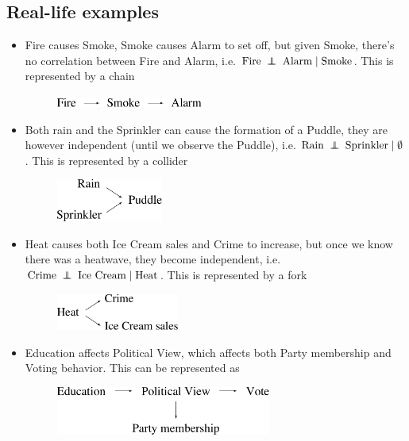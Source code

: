 \subsection{Real-life examples}
\begin{itemize}
	\item Fire causes Smoke, Smoke causes Alarm to set off, but given Smoke, there's no correlation between Fire and Alarm, i.e. $\text{Fire}\;\independent\;\text{Alarm}\;|\;\text{Smoke}$. This is represented by a chain
	\begin{figure}[h!]
	\centering
		\includegraphics[height=2.8mm]{./figs/04-fire-smoke-alarm.pdf} 
	\end{figure}

	\item Both rain and the Sprinkler can cause the formation of a Puddle, they are however independent (until we observe the Puddle), i.e. $\text{Rain}\;\independent\;\text{Sprinkler}\;|\;\emptyset$. This is represented by a collider
	\begin{figure}[h!]
	\centering
		\includegraphics[height=14mm]{./figs/04-rain-puddle-sprinkler.pdf} 
	\end{figure}

	\item Heat causes both Ice Cream sales and Crime to increase, but once we know there was a heatwave, they become independent, i.e. $\text{Crime}\;\independent\;\text{Ice Cream}\;|\;\text{Heat}$. This is represented by a fork
	\begin{figure}[h!]
	\centering
		\includegraphics[height=12mm]{./figs/04-heat-icecream-crime.pdf} 
	\end{figure}

	\item Education affects Political View, which affects both Party membership and Voting behavior. This can be represented as
	\begin{figure}[h!]
	\centering
		\includegraphics[height=16mm]{./figs/04-education-vote.pdf} 
	\end{figure}


\end{itemize}
